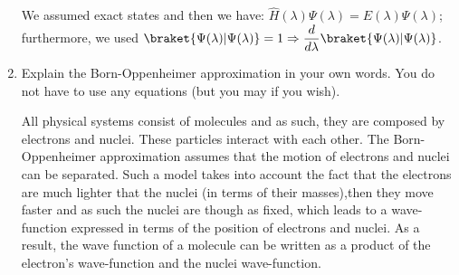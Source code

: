 \documentclass[12pt,letterpaper]{report}
\newcommand{\lam}{\lambda}
\begin{document}
\begin{enumerate}
	We assumed exact states and then we have: $ \hat{H}(\lam) \Psi(\lam) = E(\lam) \Psi(\lam)$; furthermore, we used $\braket{ \Psi(\lam) | \Psi(\lam)} = 1 \Rightarrow \dfrac{d}{d\lam} \braket{ \Psi(\lam) | \Psi(\lam)}$.
	
	\item
	Explain the Born-Oppenheimer approximation in your own words. You do not have to use any equations (but you may if you wish).
	
	All physical systems consist of molecules and as such, they are composed by electrons and nuclei. These particles interact with each other. The Born-Oppenheimer approximation assumes that the motion of electrons and nuclei can be separated. Such a model takes into account the fact that the electrons are much lighter that the nuclei (in terms of their masses),then they move faster and as such the nuclei are though as fixed, which leads to a wave-function expressed in terms of the position of electrons and nuclei. As a result, the wave function of a molecule can be written as a product of the electron's wave-function and the nuclei wave-function.	 
		 	
	\end{enumerate}
	
\end{document}
